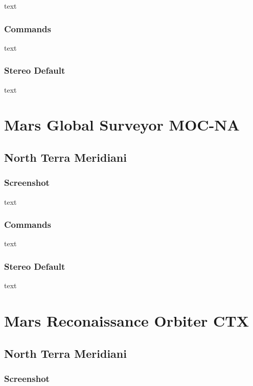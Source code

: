 text

\subsubsection*{Commands}

text

\subsubsection*{Stereo Default}

text

\section{Mars Global Surveyor MOC-NA}

\subsection{North Terra Meridiani}

\subsubsection*{Screenshot}

text

\subsubsection*{Commands}

text

\subsubsection*{Stereo Default}

text

\section{Mars Reconaissance Orbiter CTX}

\subsection{North Terra Meridiani}

\subsubsection*{Screenshot}

